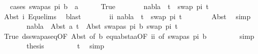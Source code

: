 \begin{isabellebody}
\ \ \isamarkupfalse%
{\isacharparenleft}{\kern0pt}cases\ {\isacartoucheopen}swapas\ pi{}\ b\ {\isacharequal}{\kern0pt}\ a{\isacartoucheclose}{\isacharparenright}{\kern0pt}\isanewline
\ \ \ \ \isamarkupfalse%
\ True\isanewline
\ \ \ \ \isamarkupfalse%
\ \isamarkupfalse%
\ {\isachardoublequoteopen}nabla\ {\isasymturnstile}\ t{}{\isacharprime}{\kern0pt}\ {\isasymapprox}\ swap\ pi{}\ t{}{\isacharprime}{\kern0pt}{\isachardoublequoteclose}\ \isanewline
\ \ \ \ \ \ \isamarkupfalse%
\ Abst\ i\ Equ{\isacharunderscore}{\kern0pt}elims{\isacharparenleft}{\kern0pt}{}{\isacharparenright}{\kern0pt}\ \isamarkupfalse%
\ blast\isanewline
\ \ \ \ \isamarkupfalse%
\ \isamarkupfalse%
\ ii{\isacharcolon}{\kern0pt}\ {\isachardoublequoteopen}nabla\ {\isasymturnstile}\ t{}{\isacharprime}{\kern0pt}\ {\isasymapprox}\ swap\ pi{}\ t{}{\isacharprime}{\kern0pt}{\isachardoublequoteclose}\isanewline
\ \ \ \ \ \ \isamarkupfalse%
\ Abst\ \isamarkupfalse%
\ simp\isanewline
\ \ \ \ \isamarkupfalse%
\ \isamarkupfalse%
\ {\isachardoublequoteopen}nabla\ {\isasymturnstile}\ Abst\ a\ t{}{\isacharprime}{\kern0pt}\ {\isasymapprox}\ Abst\ {\isacharparenleft}{\kern0pt}swapas\ pi{}\ b{\isacharparenright}{\kern0pt}\ {\isacharparenleft}{\kern0pt}swap\ pi{}\ t{}{\isacharprime}{\kern0pt}{\isacharparenright}{\kern0pt}{\isachardoublequoteclose}\isanewline
\ \ \ \ \ \ \isamarkupfalse%
\ True\ ds{\isacharunderscore}{\kern0pt}swapas{\isacharunderscore}{\kern0pt}eq{\isacharbrackleft}{\kern0pt}OF\ Abst{\isacharparenleft}{\kern0pt}{}{\isacharparenright}{\kern0pt}{\isacharcomma}{\kern0pt}\ of\ b{\isacharbrackright}{\kern0pt}\ equ{\isacharunderscore}{\kern0pt}abst{\isacharunderscore}{\kern0pt}aa{\isacharbrackleft}{\kern0pt}OF\ ii{\isacharcomma}{\kern0pt}\ of\ {\isacartoucheopen}swapas\ pi{}\ b{\isacartoucheclose}{\isacharbrackright}{\kern0pt}\ \isanewline
\ \ \ \ \ \ \isamarkupfalse%
\ simp\isanewline
\ \ \ \ \isamarkupfalse%
\ \isamarkupfalse%
\ {\isacharquery}{\kern0pt}thesis\ \isanewline
\ \ \ \ \ \ \isamarkupfalse%
\ t{}\ \isamarkupfalse%
\ simp\isanewline
\ \ \isamarkupfalse%

\end{isabellebody}
